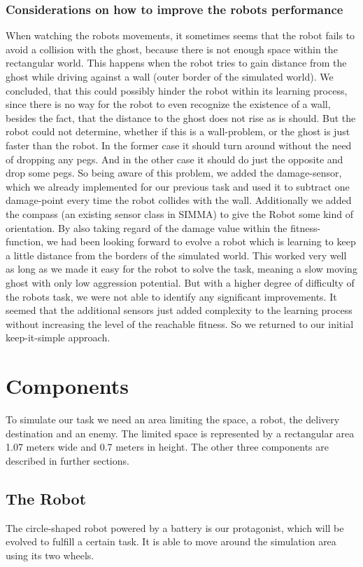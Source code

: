 \documentclass[12pt,fleqn,a4paper]{article}
\begin{document}
\subsubsection{Considerations on how to improve the robots performance}
When watching the robots movements, it sometimes seems that the robot fails to avoid a collision with the ghost, because there is not enough space within the rectangular world. This happens when the robot tries to gain distance from the ghost while driving against a wall (outer border of the simulated world). We concluded, that this could possibly hinder the robot within its learning process, since there is no way for the robot to even recognize the existence of a wall, besides the fact, that the distance to the ghost does not rise as is should. But the robot could not determine, whether if this is a wall-problem, or the ghost is just faster than the robot. In the former case it should turn around without the need of dropping any pegs. And in the other case it should do just the opposite and drop some pegs. So being aware of this problem, we added the damage-sensor, which we already implemented for our previous task and used it to subtract one damage-point every time the robot collides with the wall. Additionally we added the compass (an existing sensor class in SIMMA) to give the Robot some kind of orientation. By also taking regard of the damage value within the fitness-function, we had been looking forward to evolve a robot which is learning to keep a little distance from the borders of the simulated world. This worked very well as long as we made it easy for the robot to solve the task, meaning a slow moving ghost with only low aggression potential. But with a higher degree of difficulty of the robots task, we were not able to identify any significant improvements. It seemed that the additional sensors just added complexity to the learning process without increasing the level of the reachable fitness. So we returned to our initial keep-it-simple approach.
\newpage

\section{Components}
To simulate our task we need an area limiting the space, a robot, the delivery destination and an enemy. The limited space is represented by a rectangular area 1.07 meters wide and 0.7 meters in height. The other three components are described in further sections.

\subsection{The Robot}
The circle-shaped robot powered by a battery is our protagonist, which will be evolved to fulfill a certain task. It is able to move around the simulation area using its two wheels.
\end{document}

